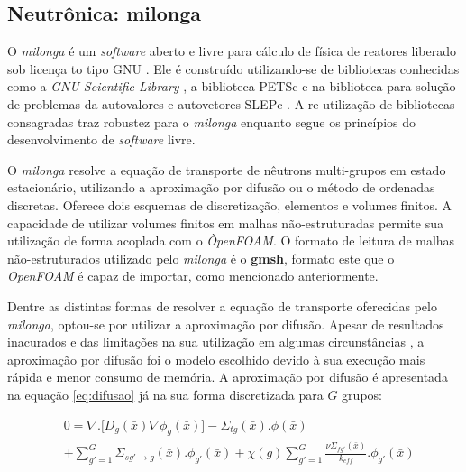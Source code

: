 
\subsection{Neutrônica: \textbf{milonga}}
\label{subs:milonga}

O \textit{milonga} é um \textit{software} aberto e livre para cálculo de física de reatores
liberado sob licença to tipo GNU \cite{gplv3}. Ele é construído utilizando-se de bibliotecas
conhecidas como a \textit{GNU Scientific Library} \cite{Galassi2009}, a biblioteca
PETSc \cite{Balay2016} e na biblioteca para solução de problemas da autovalores e autovetores
SLEPc \cite{Hernandez2005}. A re-utilização de bibliotecas consagradas traz robustez para
o \textit{milonga} enquanto segue os princípios do desenvolvimento de \textit{software} livre.

O \textit{milonga} resolve a equação de transporte de nêutrons multi-grupos em estado estacionário,
utilizando a aproximação por difusão ou o método de ordenadas discretas. Oferece dois esquemas
de discretização, elementos e volumes finitos. A capacidade de utilizar volumes finitos em malhas
não-estruturadas permite sua utilização de forma acoplada com o \textit{ÒpenFOAM}. O formato
de leitura de malhas não-estruturados utilizado pelo \textit{milonga} é o \textbf{gmsh}, formato
este que o \textit{OpenFOAM} é capaz de importar, como mencionado anteriormente.

Dentre as distintas formas de resolver a equação de transporte oferecidas pelo \textit{milonga},
optou-se por utilizar a aproximação por difusão. Apesar de resultados inacurados e das limitações
na sua utilização em algumas circunstâncias \cite{Trahan2014}, a aproximação por difusão
foi o modelo escolhido devido à sua execução mais rápida e menor consumo de memória.
A aproximação por difusão é apresentada na equação \ref{eq:difusao} já na sua forma discretizada
para $G$ grupos:

\begin{equation}
  \label{eq:difusao}
  \begin{split}
  & 0 = \nabla . \big[D_g({\bar{x}}) \nabla \phi_g(\bar{x})\big] 
- \Sigma_{tg}(\bar{x}).\phi(\bar{x}) \\
& + \sum_{g'=1}^{G} \Sigma_{sg'\rightarrow g}(\bar{x}) . \phi_{g'}(\bar{x})
+ \chi(g)  \sum_{g'=1}^{G} \frac{\nu \Sigma_{fg'}(\bar{x})}{k_{eff}} . \phi_{g'}(\bar{x}) \\
  \end{split}
  \end{equation}

